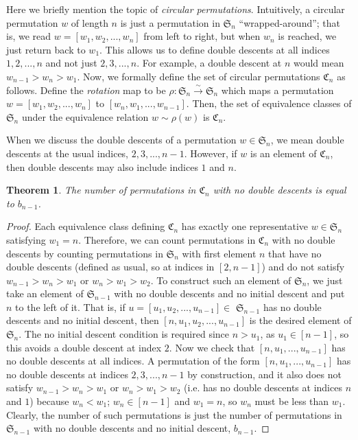 \documentclass[11pt, a4paper, reqno]{article}
\numberwithin{equation}{section}
\newtheorem{theorem}{Theorem}[section]
\theoremstyle{definition}
\begin{document}
	 Here we briefly mention the topic of \textit{circular permutations}. Intuitively, a circular permutation $w$ of length $n$ is just a permutation in $\mathfrak{S}_n$ ``wrapped-around''; that is, we read $w = [w_1, w_2, ..., w_n]$ from left to right, but when $w_n$ is reached, we just return back to $w_1$. This allows us to define double descents at all indices $1, 2,...,n$ and not just $2,3,...,n$. For example, a double descent at $n$ would mean $w_{n-1} > w_n > w_1$. Now, we formally define the set of circular permutations $\mathfrak{C}_n$ as follows. Define the \textit{rotation} map to be $\rho : \mathfrak{S}_n \xrightarrow{\sim} \mathfrak{S}_n$ which maps a permutation $w = [w_1, w_2, ..., w_n]$ to $[w_n, w_1, ..., w_{n-1}]$. Then, the set of equivalence classes of $\mathfrak{S}_n$ under the equivalence relation $w \sim \rho(w)$ is $\mathfrak{C}_n$.
	
	 When we discuss the double descents of a permutation $w \in \mathfrak{S}_n$, we mean double descents at the usual indices, $2, 3, ..., n-1$. However, if $w$ is an element of $\mathfrak{C}_n$, then double descents may also include indices $1$ and $n$.
	
	\begin{theorem}
		The number of permutations in $\mathfrak{C}_n$ with no double descents is equal to $b_{n-1}$.
	\end{theorem}
	\begin{proof}
		Each equivalence class defining $\mathfrak{C}_n$ has exactly one representative $w \in \mathfrak{S}_n$ satisfying $w_1 = n$. Therefore, we can count permutations in $\mathfrak{C}_n$ with no double descents by counting permutations in $\mathfrak{S}_n$ with first element $n$ that have no double descents (defined as usual, so at indices in $[2, n-1]$) and do not satisfy $w_{n-1} > w_n > w_1$ or $w_n > w_1 > w_2$. To construct such an element of $\mathfrak{S}_n$, we just take an element of $\mathfrak{S}_{n-1}$ with no double descents and no initial descent and put $n$ to the left of it. That is, if $u = [u_1, u_2, ..., u_{n-1}] \in$ $ \mathfrak{S}_{n-1}$ has no double descents and no initial descent, then $[n, u_1, u_2, ..., u_{n-1}]$ is the desired element of $\mathfrak{S}_n$. The no initial descent condition is required since $n > u_1$, as $u_1 \in [n-1]$, so this avoids a double descent at index $2$. Now we check that $[n, u_1, ..., u_{n-1}]$ has no double descents at all indices. A permutation of the form $[n, u_1, ..., u_{n-1}]$ has no double descents at indices $2,3,...,n-1$ by construction, and it also does not satisfy $w_{n-1} > w_n > w_1$ or $w_n > w_1 > w_2$ (i.e. has no double descents at indices $n$ and $1$) because $w_n < w_1$; $w_n \in [n-1]$ and $w_1 = n$, so $w_n$ must be less than $w_1$. Clearly, the number of such permutations is just the number of permutations in $\mathfrak{S}_{n-1}$ with no double descents and no initial descent, $b_{n-1}$.
	\end{proof}
	
\end{document}
